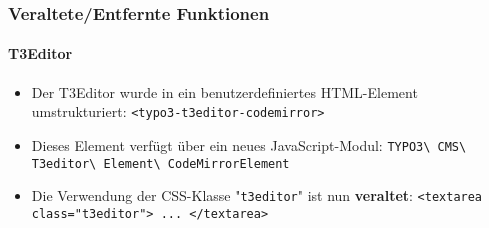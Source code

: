 %

\begin{frame}[fragile]
	\frametitle{Veraltete/Entfernte Funktionen}
	\framesubtitle{T3Editor}

	\begin{itemize}
		\item Der T3Editor wurde in ein benutzerdefiniertes HTML-Element umstrukturiert:\newline
			\smaller\texttt{<typo3-t3editor-codemirror>}\normalsize

		\item Dieses Element verfügt über ein neues JavaScript-Modul:\newline
			\small
				\texttt{TYPO3\textbackslash
					CMS\textbackslash
					T3editor\textbackslash
					Element\textbackslash
					CodeMirrorElement}
			\normalsize

		\item Die Verwendung der CSS-Klasse "\texttt{t3editor}" ist nun \textbf{veraltet}:\newline
			\smaller\texttt{<textarea class="t3editor"> ... </textarea>}\normalsize

	\end{itemize}

\end{frame}

